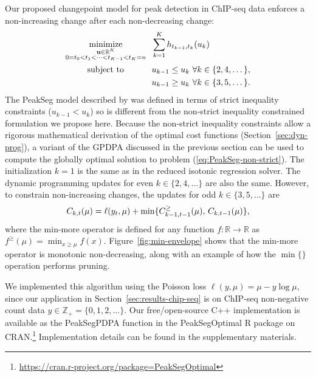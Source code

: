 \documentclass[twoside,11pt]{article}
\DeclareMathOperator*{\minimize}{minimize}
\newcommand{\ZZ}{\mathbb Z}
\newcommand{\RR}{\mathbb R}
\begin{document}
Our proposed changepoint model for peak detection in ChIP-seq data enforces a
non-increasing change after each non-decreasing change:
\begin{align}
  \label{eq:PeakSeg-non-strict}
  \minimize_{
        \substack{\mathbf u\in\RR^K \\
    0=t_0<t_1<\cdots<t_{K-1}<t_K=n
}
    } &\ \ 
  \sum_{k=1}^K h_{t_{k-1}, t_k}(u_k)\\
      \text{subject to \hskip 0.8cm} &\ \ u_{k-1} \leq u_k\ \forall k\in\{2,4,\dots\},
  \nonumber\\
  &\ \ u_{k-1} \geq u_k\ \forall k\in\{3,5,\dots\}.
  \nonumber
\nonumber
\end{align}
The PeakSeg model described by \citet{HOCKING-PeakSeg} was defined in
terms of strict inequality constraints ($u_{k-1}<u_k$) so is 
different from the non-strict inequality constrained formulation we
propose here. Because the non-strict inequality constraints allow a
rigorous mathematical derivation of the optimal cost functions
(Section~\ref{sec:dyn-prog}), a variant of the GPDPA discussed in the
previous section can be used to compute the globally optimal solution
to problem (\ref{eq:PeakSeg-non-strict}). The initialization $k=1$ is
the same as in the reduced isotonic regression solver. The dynamic
programming updates for even $k\in\{2, 4, \dots\}$ are also the
same. However, to constrain non-increasing changes, the updates for
odd $k\in\{3, 5, \dots\}$ are
\begin{equation}
  C_{k,t}(\mu) = \ell(y_t, \mu) + \min\{
  C_{k-1,t-1}^\geq(\mu),\, C_{k,t-1}(\mu)
  \},
\end{equation}
where the min-more operator is defined for any function $f:\RR\rightarrow\RR$ as
$f^\geq(\mu) = \min_{x\geq \mu} f(x)$. Figure~\ref{fig:min-envelope}
shows that the min-more operator is monotonic non-decreasing, along
with an example of how the $\min\{\}$ operation performs pruning.

We implemented this algorithm using the Poisson loss
$\ell(y, \mu) = \mu - y\log \mu$, since our application in
Section~\ref{sec:results-chip-seq} is on ChIP-seq non-negative count data
$y\in\ZZ_+ = \{0, 1, 2, \dots\}$.
Our free/open-source C++ implementation is
available as the PeakSegPDPA function in the PeakSegOptimal R package
on
CRAN.\footnote{\url{https://cran.r-project.org/package=PeakSegOptimal}}
Implementation details can be found in the supplementary materials.
\end{document}

